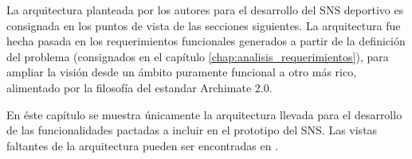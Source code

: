 La arquitectura planteada por los autores para el desarrollo del SNS deportivo es consignada en los puntos de vista de las secciones siguientes. La arquitectura fue hecha pasada en los requerimientos funcionales generados a partir de la definición del problema (consignados en el capítulo \ref{chap:analisis_requerimientos}), para ampliar la visión desde un ámbito puramente funcional a otro más rico, alimentado por la filosofía del estandar Archimate 2.0.

En éste capítulo se muestra únicamente la arquitectura llevada para el desarrollo de las funcionalidades pactadas a incluir en el prototipo del SNS. Las vistas faltantes de la arquitectura pueden ser encontradas en \cite{anexos_tesis}.

